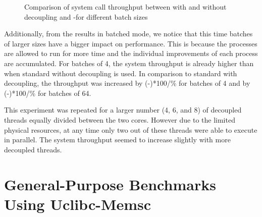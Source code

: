\begin{figure}[h!]
\caption{Comparison of system call throughput between \llinux with and without
  decoupling and \llinux-\memsc for different batch sizes}
\label{fig:throughput}
\end{figure}

Additionally, from the \memsc results in batched mode, we notice that this time
batches of larger sizes have a bigger impact on performance. This is because
the processes are allowed to run for more time and the individual improvements
of each process are accumulated. For batches of 4, the system throughput is
already higher than when standard \llinux without decoupling is used. In
comparison to standard \llinux with decoupling, the throughput was increased by
{\the\numexpr(\Hd-\Hipi)*100/\Hipi\relax}\% for batches of 4 and by
{\the\numexpr(\Hh-\Hipi)*100/\Hipi\relax}\% for batches of 64.

This experiment was repeated for a larger number (4, 6, and 8) of decoupled
threads equally divided between the two cores. However due to the limited
physical resources, at any time only two out of these threads were able to
execute in parallel. The system throughput seemed to increase slightly with
more decoupled threads.

\section{General-Purpose Benchmarks Using Uclibc-Memsc}

